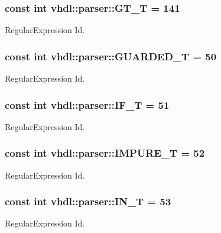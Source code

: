 \subsubsection[{G\+T\+\_\+\+T}]{\setlength{\rightskip}{0pt plus 5cm}const int vhdl\+::parser\+::\+G\+T\+\_\+\+T = 141}\label{namespacevhdl_1_1parser_a72a2b40c0bac0d01ab8bfac7ccd9d670}
Regular\+Expression Id. \hypertarget{namespacevhdl_1_1parser_a7f3a0121dde900ca7ecf58402aaadd89}{}
\subsubsection[{G\+U\+A\+R\+D\+E\+D\+\_\+\+T}]{\setlength{\rightskip}{0pt plus 5cm}const int vhdl\+::parser\+::\+G\+U\+A\+R\+D\+E\+D\+\_\+\+T = 50}\label{namespacevhdl_1_1parser_a7f3a0121dde900ca7ecf58402aaadd89}
Regular\+Expression Id. \hypertarget{namespacevhdl_1_1parser_a7de8353988468d115d48044c9f9f0986}{}
\subsubsection[{I\+F\+\_\+\+T}]{\setlength{\rightskip}{0pt plus 5cm}const int vhdl\+::parser\+::\+I\+F\+\_\+\+T = 51}\label{namespacevhdl_1_1parser_a7de8353988468d115d48044c9f9f0986}
Regular\+Expression Id. \hypertarget{namespacevhdl_1_1parser_acdf6b71df4d79de27d08f56940c4d83b}{}
\subsubsection[{I\+M\+P\+U\+R\+E\+\_\+\+T}]{\setlength{\rightskip}{0pt plus 5cm}const int vhdl\+::parser\+::\+I\+M\+P\+U\+R\+E\+\_\+\+T = 52}\label{namespacevhdl_1_1parser_acdf6b71df4d79de27d08f56940c4d83b}
Regular\+Expression Id. \hypertarget{namespacevhdl_1_1parser_ad1402811380141ac2aa6ebace155f9af}{}
\subsubsection[{I\+N\+\_\+\+T}]{\setlength{\rightskip}{0pt plus 5cm}const int vhdl\+::parser\+::\+I\+N\+\_\+\+T = 53}\label{namespacevhdl_1_1parser_ad1402811380141ac2aa6ebace155f9af}
Regular\+Expression Id. \hypertarget{namespacevhdl_1_1parser_af211442cf9b2542a35ed9237208dbd5a}{}
